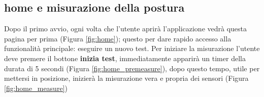 \subsection{home e misurazione della postura}
Dopo il primo avvio, ogni volta che l'utente aprirà l'applicazione vedrà questa pagina per prima (Figura \ref{fig:home}); questo per dare rapido accesso alla funzionalità principale: eseguire un nuovo test. Per iniziare la misurazione l'utente deve premere il bottone {\bfseries inizia test}, immediatamente apparirà un timer della durata di 5 secondi (Figura \ref{fig:home_premeasure}), dopo questo tempo, utile per mettersi in posizione, inizierà la misurazione vera e propria dei sensori (Figura \ref{fig:home_measure})

\begin{figure}[!htb]
    \centering
    \begin{subfigure}{.35\textwidth}

\end{subfigure}
\end{figure}
